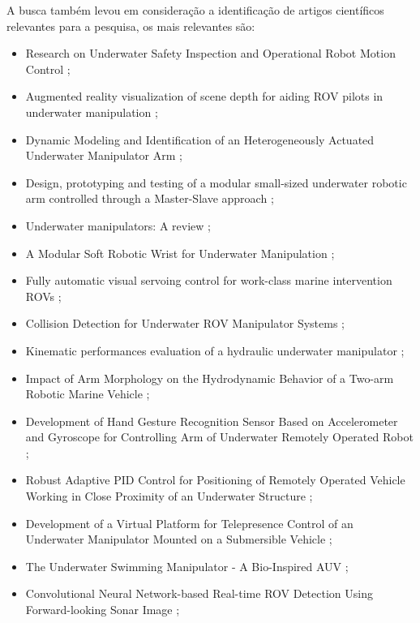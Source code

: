 A busca também levou em consideração a identificação de artigos científicos relevantes para a pesquisa, os mais relevantes são:  
\begin{itemize}
	\item Research on Underwater Safety Inspection and Operational Robot Motion Control \cite{guangyi2018research};
	\item Augmented reality visualization of scene depth for aiding ROV pilots in underwater manipulation \cite{bruno2018augmented};
	\item Dynamic Modeling and Identification of an Heterogeneously Actuated Underwater Manipulator Arm \cite{leborne2018dynamic};
	\item Design, prototyping and testing of a modular small-sized underwater robotic arm controlled through a Master-Slave approach \cite{barbieri2018design};
	\item Underwater manipulators: A review \cite{sivvcev2018underwater};
	\item A Modular Soft Robotic Wrist for Underwater Manipulation \cite{kurumaya2018modular};
	\item Fully automatic visual servoing control for work-class marine intervention ROVs \cite{sivvcev2018fully};
	\item Collision Detection for Underwater ROV Manipulator Systems \cite{sivvcev2018collision};
	\item Kinematic performances evaluation of a hydraulic underwater manipulator \cite{rizzo2017kinematic};
	\item Impact of Arm Morphology on the Hydrodynamic Behavior of a Two-arm Robotic Marine Vehicle \cite{kazakidi2017impact};
	\item Development of Hand Gesture Recognition Sensor Based on Accelerometer and Gyroscope for Controlling Arm of Underwater Remotely Operated Robot \cite{mardiyanto2017development};
	\item Robust Adaptive PID Control for Positioning of Remotely Operated Vehicle Working in Close Proximity of an Underwater Structure \cite{qiao2016robust};
	\item Development of a Virtual Platform for Telepresence Control of an Underwater Manipulator Mounted on a Submersible Vehicle \cite{zhang2016development};
	\item The Underwater Swimming Manipulator - A Bio-Inspired AUV \cite{sverdrup2016underwater};
	\item Convolutional Neural Network-based Real-time ROV Detection Using Forward-looking Sonar Image \cite{kim2016convolutional};

\end{itemize}
